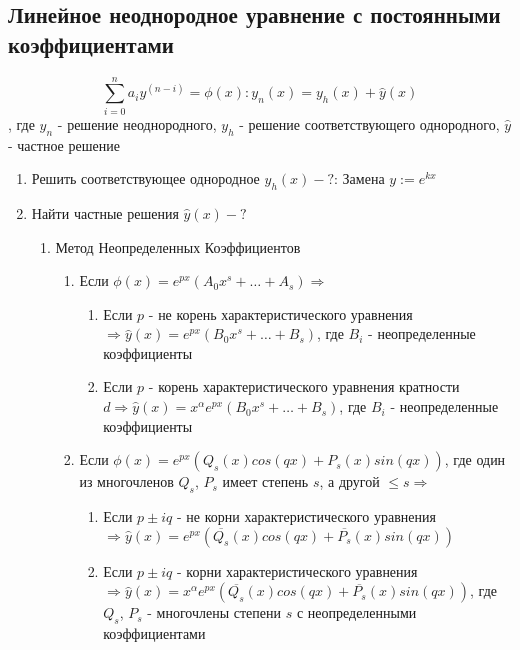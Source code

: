 \documentclass[a5paper,10pt]{article}
\begin{document}
		\subsection{Линейное неоднородное уравнение с постоянными коэффициентами}
			\label{LinearNonhomogeneous}
			$$ \sum\limits_{i=0}^n a_i y^{(n-i)} = \phi(x): y_n(x) = y_h(x)+\hat y(x) $$, где $ y_n $ - решение неоднородного, $ y_h $ - решение соответствующего однородного, $ \hat y $ - частное решение
			\begin{enumerate}
				\item Решить соответствующее однородное $ y_h(x) - ? $: Замена $ y:=e^{kx} $

				\item Найти частные решения $ \hat y(x) - ? $
					\begin{enumerate}
						\item Метод Неопределенных Коэффициентов
							\begin{enumerate}
								\item Если $ \phi(x) =e^{px}(A_0x^s+\ldots+A_s) \Rightarrow $
									\begin{enumerate}
										\item Если $p$ - не корень характеристического уравнения $ \Rightarrow \hat y(x) = e^{px}(B_0x^s+\ldots+B_s) $, где $B_i$ - неопределенные коэффициенты
										\item Если $p$ - корень характеристического уравнения кратности $d \Rightarrow \hat y(x) = x^\alpha e^{px}(B_0x^s+\ldots+B_s)$, где $B_i$ - неопределенные коэффициенты
									\end{enumerate}
								\item Если $ \phi(x) = e^{px}(Q_s(x)cos(qx)+P_s(x)sin(qx)) $, где один из многочленов $Q_s$, $P_s$ имеет степень $s$, а другой $\leq s \Rightarrow$
									\begin{enumerate}
										\item Если $p\pm iq$ - не корни характеристического уравнения $ \Rightarrow \hat y(x) = e^{px}(\overline{Q_s}(x)cos(qx)+\overline{P_s}(x)sin(qx)) $
										\item Если $p\pm iq$ - корни характеристического уравнения $ \Rightarrow \hat y(x) = x^\alpha e^{px}(\overline{Q_s}(x)cos(qx)+\overline{P_s}(x)sin(qx)) $, где $Q_s$, $P_s$ - многочлены степени $s$ с неопределенными коэффициентами
									\end{enumerate}
							\end{enumerate}


\end{enumerate}
\end{enumerate}
\end{document}
